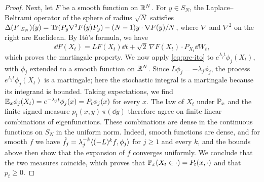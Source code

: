 \begin{proof}
Next, let $F$ be a smooth function on $\mathbb R^N$. For $y\in S_N$, the Laplace--Beltrami operator of the sphere of radius $\sqrt N$ satisfies $\Delta(F|_{S_N})(y)=\operatorname{Tr}(P_y\nabla^2F(y)P_y)-(N-1)y\cdot\nabla F(y)/N$, where $\nabla$ and $\nabla^2$ on the right are Euclidean. By It\^o's formula, we have
\begin{equation}\label{eq:pre-ito}
\dd F(X_t)=LF(X_t)\dd t+\sqrt2\,\nabla F(X_t)\cdot P_{X_t}\dd W_t,
\end{equation}
which proves the martingale property. We now apply \eqref{eq:pre-ito} to $e^{\lambda_jt}\phi_j(X_t)$, with $\phi_j$ extended to a smooth function on $\mathbb R^N$. Since $L\phi_j=-\lambda_j\phi_j$, the process $e^{\lambda_jt}\phi_j(X_t)$ is a martingale; here the stochastic integral is a martingale because its integrand is bounded. Taking expectations, we find $\mathbb E_x\phi_j(X_t)=e^{-\lambda_jt}\phi_j(x)=P_t\phi_j(x)$ for every $x$. The law of $X_t$ under $\mathbb P_x$ and the finite signed measure $p_t(x,y)\,\pi(\dd y)$ therefore agree on finite linear combinations of eigenfunctions. These combinations are dense in the continuous functions on $S_N$ in the uniform norm. Indeed, smooth functions are dense, and for smooth $f$ we have $\hat f_j=\lambda_j^{-k}\langle(-L)^kf,\phi_j\rangle$ for $j\ge1$ and every $k$, and the bounds above then show that the expansion of $f$ converges uniformly. We conclude that the two measures coincide, which proves that $\mathbb P_x(X_t\in\cdot)=P_t(x,\cdot)$ and that $p_t\ge0$.
\end{proof}

